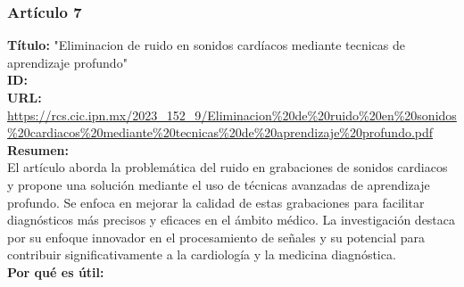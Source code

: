 \subsubsection*{Artículo 7}
     \textbf{Título:}
     "Eliminacion de ruido en sonidos cardíacos mediante tecnicas de aprendizaje profundo"
     \\
     \textbf{ID: \cite{rodriguezeliminacion}}
     \\
     \textbf{URL:}
     \url{https://rcs.cic.ipn.mx/2023_152_9/Eliminacion%20de%20ruido%20en%20sonidos%20cardiacos%20mediante%20tecnicas%20de%20aprendizaje%20profundo.pdf}
     \\
     \textbf{Resumen:\\}
     El artículo aborda la problemática del ruido en grabaciones de sonidos cardiacos y propone una solución mediante el uso de técnicas avanzadas de aprendizaje profundo. Se enfoca en mejorar la calidad de estas grabaciones para facilitar diagnósticos más precisos y eficaces en el ámbito médico. La investigación destaca por su enfoque innovador en el procesamiento de señales y su potencial para contribuir significativamente a la cardiología y la medicina diagnóstica.
     \\
     \textbf{Por qué es útil:\\}
